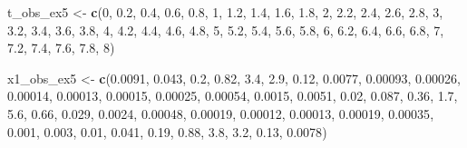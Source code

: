 \documentclass[
]{article}
\newenvironment{Shaded}{\begin{snugshade}}{\end{snugshade}}
\newcommand{\DecValTok}[1]{\textcolor[rgb]{0.00,0.00,0.81}{#1}}
\newcommand{\FloatTok}[1]{\textcolor[rgb]{0.00,0.00,0.81}{#1}}
\newcommand{\FunctionTok}[1]{\textcolor[rgb]{0.13,0.29,0.53}{\textbf{#1}}}
\newcommand{\NormalTok}[1]{#1}
\newcommand{\OtherTok}[1]{\textcolor[rgb]{0.56,0.35,0.01}{#1}}
\begin{document}
\begin{Shaded}
\begin{Highlighting}[]
\NormalTok{t\_obs\_ex5 }\OtherTok{\textless{}{-}} \FunctionTok{c}\NormalTok{(}\DecValTok{0}\NormalTok{, }\FloatTok{0.2}\NormalTok{, }\FloatTok{0.4}\NormalTok{, }\FloatTok{0.6}\NormalTok{, }\FloatTok{0.8}\NormalTok{, }\DecValTok{1}\NormalTok{, }\FloatTok{1.2}\NormalTok{, }\FloatTok{1.4}\NormalTok{, }\FloatTok{1.6}\NormalTok{, }\FloatTok{1.8}\NormalTok{,}
    \DecValTok{2}\NormalTok{, }\FloatTok{2.2}\NormalTok{, }\FloatTok{2.4}\NormalTok{, }\FloatTok{2.6}\NormalTok{, }\FloatTok{2.8}\NormalTok{, }\DecValTok{3}\NormalTok{, }\FloatTok{3.2}\NormalTok{, }\FloatTok{3.4}\NormalTok{, }\FloatTok{3.6}\NormalTok{, }\FloatTok{3.8}\NormalTok{, }\DecValTok{4}\NormalTok{, }\FloatTok{4.2}\NormalTok{, }\FloatTok{4.4}\NormalTok{,}
    \FloatTok{4.6}\NormalTok{, }\FloatTok{4.8}\NormalTok{, }\DecValTok{5}\NormalTok{, }\FloatTok{5.2}\NormalTok{, }\FloatTok{5.4}\NormalTok{, }\FloatTok{5.6}\NormalTok{, }\FloatTok{5.8}\NormalTok{, }\DecValTok{6}\NormalTok{, }\FloatTok{6.2}\NormalTok{, }\FloatTok{6.4}\NormalTok{, }\FloatTok{6.6}\NormalTok{, }\FloatTok{6.8}\NormalTok{, }\DecValTok{7}\NormalTok{,}
    \FloatTok{7.2}\NormalTok{, }\FloatTok{7.4}\NormalTok{, }\FloatTok{7.6}\NormalTok{, }\FloatTok{7.8}\NormalTok{, }\DecValTok{8}\NormalTok{)}

\NormalTok{x1\_obs\_ex5 }\OtherTok{\textless{}{-}} \FunctionTok{c}\NormalTok{(}\FloatTok{0.0091}\NormalTok{, }\FloatTok{0.043}\NormalTok{, }\FloatTok{0.2}\NormalTok{, }\FloatTok{0.82}\NormalTok{, }\FloatTok{3.4}\NormalTok{, }\FloatTok{2.9}\NormalTok{, }\FloatTok{0.12}\NormalTok{, }\FloatTok{0.0077}\NormalTok{,}
    \FloatTok{0.00093}\NormalTok{, }\FloatTok{0.00026}\NormalTok{, }\FloatTok{0.00014}\NormalTok{, }\FloatTok{0.00013}\NormalTok{, }\FloatTok{0.00015}\NormalTok{, }\FloatTok{0.00025}\NormalTok{, }\FloatTok{0.00054}\NormalTok{,}
    \FloatTok{0.0015}\NormalTok{, }\FloatTok{0.0051}\NormalTok{, }\FloatTok{0.02}\NormalTok{, }\FloatTok{0.087}\NormalTok{, }\FloatTok{0.36}\NormalTok{, }\FloatTok{1.7}\NormalTok{, }\FloatTok{5.6}\NormalTok{, }\FloatTok{0.66}\NormalTok{, }\FloatTok{0.029}\NormalTok{,}
    \FloatTok{0.0024}\NormalTok{, }\FloatTok{0.00048}\NormalTok{, }\FloatTok{0.00019}\NormalTok{, }\FloatTok{0.00012}\NormalTok{, }\FloatTok{0.00013}\NormalTok{, }\FloatTok{0.00019}\NormalTok{, }\FloatTok{0.00035}\NormalTok{,}
    \FloatTok{0.001}\NormalTok{, }\FloatTok{0.003}\NormalTok{, }\FloatTok{0.01}\NormalTok{, }\FloatTok{0.041}\NormalTok{, }\FloatTok{0.19}\NormalTok{, }\FloatTok{0.88}\NormalTok{, }\FloatTok{3.8}\NormalTok{, }\FloatTok{3.2}\NormalTok{, }\FloatTok{0.13}\NormalTok{, }\FloatTok{0.0078}\NormalTok{)}


\end{Highlighting}
\end{Shaded}
\end{document}
